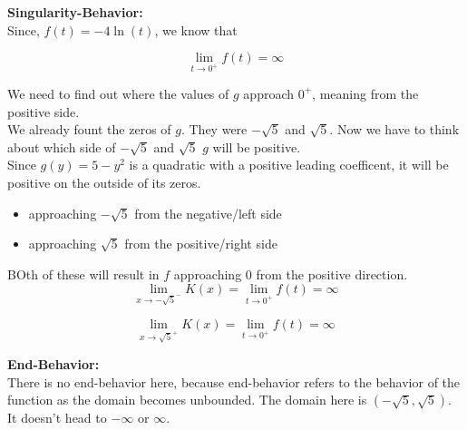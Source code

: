 \documentclass{ximera}
\begin{document}
\textbf{\textcolor{blue!55!black}{Singularity-Behavior:}} \\



Since, $f(t) = -4 \ln(t)$, we know that 


\[
\lim\limits_{t \to 0^+} f(t) = \infty
\]



We need to find out where the values of $g$ approach $0^+$, meaning from the positive side. \\


We already fount the zeros of $g$.  They were $-\sqrt{5}$ and $\sqrt{5}$.  Now we have to think about which side of $-\sqrt{5}$ and $\sqrt{5}$ $g$ will be positive. \\


Since $g(y) = 5 - y^2$ is a quadratic with a positive leading coefficent, it will be positive on the outside of its zeros. 

\begin{itemize}
\item approaching $-\sqrt{5}$ from the negative/left side
\item approaching $\sqrt{5}$ from the positive/right side
\end{itemize}

BOth of these will result in $f$ approaching $0$ from the positive direction. \\



\[
\lim\limits_{x \to -\sqrt{5}^-} K(x)  = \lim\limits_{t \to 0^+} f(t) = \infty
\]



\[
\lim\limits_{x \to \sqrt{5}^+} K(x)  = \lim\limits_{t \to 0^+} f(t) = \infty
\]
















\textbf{\textcolor{blue!55!black}{End-Behavior:}} \\

There is no end-behavior here, because end-behavior refers to the behavior of the function as the domain becomes unbounded.  The domain here is $(-\sqrt{5}, \sqrt{5})$. It doesn't head to $-\infty$ or $\infty$.
\end{document}
